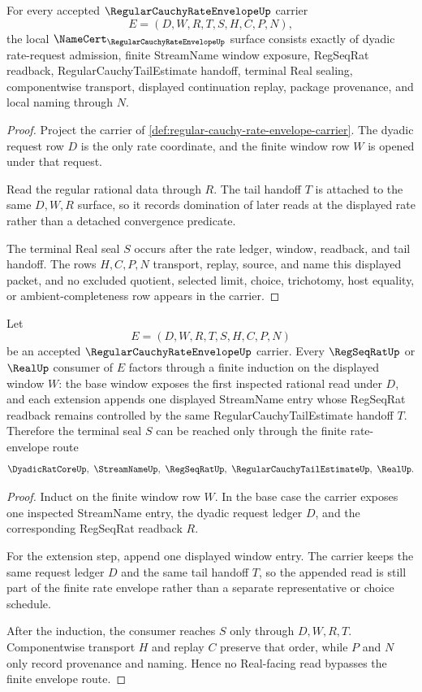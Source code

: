 \begin{theorem}
\label{thm:regular-cauchy-rate-envelope-namecert-obligations}
For every accepted $\RegularCauchyRateEnvelopeUp$ carrier
$$
E=(D,W,R,T,S,H,C,P,N),
$$
the local $\NameCert_{\RegularCauchyRateEnvelopeUp}$ surface consists exactly of dyadic rate-request admission, finite StreamName window exposure, RegSeqRat readback, RegularCauchyTailEstimate handoff, terminal Real sealing, componentwise transport, displayed continuation replay, package provenance, and local naming through $N$.
\end{theorem}
\begin{proof}
Project the carrier of \autoref{def:regular-cauchy-rate-envelope-carrier}. The dyadic request row $D$ is the only rate coordinate, and the finite window row $W$ is opened under that request.

Read the regular rational data through $R$. The tail handoff $T$ is attached to the same $D,W,R$ surface, so it records domination of later reads at the displayed rate rather than a detached convergence predicate.

The terminal Real seal $S$ occurs after the rate ledger, window, readback, and tail handoff. The rows $H,C,P,N$ transport, replay, source, and name this displayed packet, and no excluded quotient, selected limit, choice, trichotomy, host equality, or ambient-completeness row appears in the carrier.
\end{proof}

\begin{theorem}
\label{thm:regular-cauchy-rate-envelope-finite-induction}
Let
$$
E=(D,W,R,T,S,H,C,P,N)
$$
be an accepted $\RegularCauchyRateEnvelopeUp$ carrier. Every $\RegSeqRatUp$ or $\RealUp$ consumer of $E$ factors through a finite induction on the displayed window $W$: the base window exposes the first inspected rational read under $D$, and each extension appends one displayed StreamName entry whose RegSeqRat readback remains controlled by the same RegularCauchyTailEstimate handoff $T$. Therefore the terminal seal $S$ can be reached only through the finite rate-envelope route
$$
\DyadicRatCoreUp,\ \StreamNameUp,\ \RegSeqRatUp,\ \RegularCauchyTailEstimateUp,\ \RealUp .
$$
\end{theorem}
\begin{proof}
Induct on the finite window row $W$. In the base case the carrier exposes one inspected StreamName entry, the dyadic request ledger $D$, and the corresponding RegSeqRat readback $R$.

For the extension step, append one displayed window entry. The carrier keeps the same request ledger $D$ and the same tail handoff $T$, so the appended read is still part of the finite rate envelope rather than a separate representative or choice schedule.

After the induction, the consumer reaches $S$ only through $D,W,R,T$. Componentwise transport $H$ and replay $C$ preserve that order, while $P$ and $N$ only record provenance and naming. Hence no Real-facing read bypasses the finite envelope route.
\end{proof}

